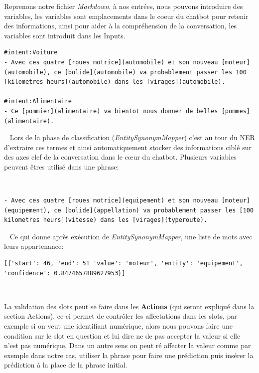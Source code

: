 Reprenons notre fichier \textit{Markdown}, à nos entrées, nous pouvons introduire des variables, les variables sont emplacements dans le coeur du chatbot pour retenir des informations, ainsi pour aider à la compréhension de la conversation, les variables sont introduit dans les Inputs.
\ \linebreak
\begin{lstlisting}
#intent:Voiture
- Avec ces quatre [roues motrice](automobile) et son nouveau [moteur](automobile), ce [bolide](automobile) va probablement passer les 100 [kilometres heurs](automobile) dans les [virages](automobile).

#intent:Alimentaire
- Ce [pommier](alimentaire) va bientot nous donner de belles [pommes](alimentaire).
\end{lstlisting}
\ \linebreak
Lors de la phase de classification (\textit{EntitySynonymMapper}) c'est au tour du NER d'extraire ces termes et ainsi automatiquement stocker des informations ciblé sur des axes clef de la conversation dans le cœur du chatbot. Plusieurs variables peuvent êtres utilisé dans une phrase:

\ \linebreak
\begin{lstlisting}
- Avec ces quatre [roues motrice](equipement) et son nouveau [moteur](equipement), ce [bolide](appellation) va probablement passer les [100 kilometres heurs](vitesse) dans les [virages](typeroute).
\end{lstlisting}

\ \linebreak
Ce qui donne après exécution de \textit{EntitySynonymMapper}, une liste de mots avec leurs appartenance:

\begin{lstlisting}
[{'start': 46, 'end': 51 'value': 'moteur', 'entity': 'equipement', 'confidence': 0.8474657889627953}]
\end{lstlisting}
\ \linebreak 

La validation des slots peut se faire dans les \textbf{Actions} (qui seront expliqué dans la section Actions), ce-ci permet de contrôler les affectations dans les slots, par exemple si on veut une identifiant numérique, alors nous pouvons faire une condition sur le slot en question et lui dire ne de pas accepter la valeur si elle n'est pas numérique. Dans un autre sens on peut ré affecter la valeur comme par exemple dans notre cas, utiliser la phrase pour faire une prédiction puis insérer la prédiction à la place de la phrase initial.

